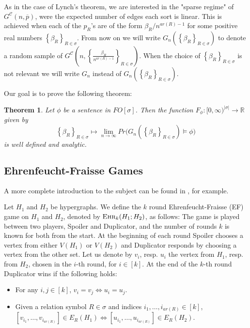 \documentclass[12pt,notitlepage,a4paper]{article}
\newtheorem{theorem}{Theorem}[section]
\theoremstyle{definition}
\newcommand{\R}{\mathbb{R}}
\newcommand{\Ln}{\lim\limits_{n\to \infty}}
\newcommand{\ehr}{\textsc{Ehr}}
\newcommand{\InR}[1]{\left\{ #1_R \right\}_{R\in \sigma}}
\begin{document}
As in the case of Lynch's theorem, we are interested in the
"sparse regime" of $G^\mathcal{C}(n,\overline{p})$, were the 
expected number of edges each sort is linear. 
This is achieved when each of the $p_R$'s are 
of the form $\beta_R/n^{ar(R)-1}$ for some 
positive real numbers $\InR{\beta}$.
From now on we will write $G_n\left(\InR{\beta}\right)$
to denote a random sample of 
$G^\mathcal{C}\left(n,\left\{ \frac{
\beta_R}{n^{ar(R)-1}}\right\}_{R\in\sigma}\right)$.
When the choice of $\InR{\beta}$ is not relevant
we will write $G_n$ instead of 
$G_n\left(\InR{\beta}\right)$.\par

Our goal is to prove the following theorem:


\begin{theorem} \label{thm:main}
	Let $\phi$ be a sentence in $FO[\sigma]$. Then
	the function
	$F_\phi: [0,\infty)^{|\sigma|}
	\rightarrow \R$ given by 
	\[
	\InR{\beta} \mapsto \Ln Pr\big( G_n\left(
	\InR{\beta}\right) \models \phi\big)
	\]
	is well defined and analytic. 
\end{theorem}



\subsection{Ehrenfeucht-Fraisse Games}


A more complete introduction to the subject can be found in
\cite[Section 2]{finitemodeltheory1}, for example.\par

Let $H_1$ and $H_2$ be hypergraphs. We define the $k$ round 
Ehrenfeucht-Fraisse (EF) game on $H_1$ and $H_2$, denoted by
$\ehr_k(H_1;H_2)$, as follows:
The game is played between two players, Spoiler and Duplicator, and
the number of rounds $k$ is known for both from the start.
At the beginning of each round Spoiler chooses a vertex from either
$V(H_1)$ or $V(H_2)$ and Duplicator responds by choosing a vertex
from the other set.
Let us denote by 
$v_i$, resp. $u_i$ the vertex from $H_1$, resp. from $H_2$, 
chosen in the $i$-th round,
for $i\in [k]$. At the end of the $k$-th round 
Duplicator wins if the following holds:
\begin{itemize}
	\item For any $i,j\in [k]$, $v_i=v_j \iff u_i=u_j$.
	\item Given a relation symbol $R\in \sigma$ 
	and indices $i_1,\dots, i_{ar(R)} \in [k]$, 
	$[v_{i_1},\dots,v_{i_{ar(R)}}] \in E_R(H_1) \iff 
	[u_{i_1},\dots,u_{i_{ar(R)}}]
	\in E_R(H_2)$.
	
\end{itemize}
\end{document}
